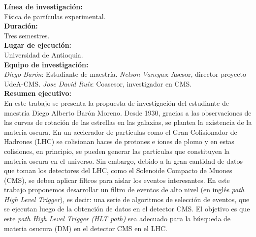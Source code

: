 \textbf{Línea de investigación:}\\
Física de partículas experimental.
\\

\textbf{Duración:}\\
Tres semestres.
\\

\textbf{Lugar de ejecución:}\\
Universidad de Antioquia.
\\

\textbf{Equipo de investigación:}\\
\emph{Diego Barón}: Estudiante de maestría.
\emph{Nelson Vanegas}: Asesor, director proyecto UdeA-CMS.
\emph{Jose David Ruíz}: Coasesor, investigador en CMS.
\\

\textbf{Resumen ejecutivo:}\\
En este trabajo se presenta la propuesta de investigación del estudiante de maestría Diego Alberto Barón Moreno. Desde 1930, gracias a las observaciones de las curvas de rotación de las estrellas en las galaxias, se plantea la existencia de la materia oscura. En un acelerador de partículas como el Gran Colisionador de Hadrones (LHC) se colisionan haces de protones e iones de plomo y en estas colisiones, en principio, se pueden generar las partículas que constituyen la materia oscura en el universo. Sin embargo, debido a la gran cantidad de datos que toman los detectores del LHC, como el Solenoide Compacto de Muones (CMS)\cite{Bayatian:2006nff}, se deben aplicar filtros para aislar los eventos interesantes. En este trabajo proponemos desarrollar un filtro de eventos de alto nivel (en inglés \textit{path High Level Trigger}), es decir: una serie de algoritmos de selección de eventos, que se ejecutan luego de la obtención de datos en el detector CMS. El objetivo es que este \textit{path High Level Trigger (HLT path)} sea adecuado para la búsqueda de materia osucura (DM) en el detector CMS en el LHC.


\newpage























